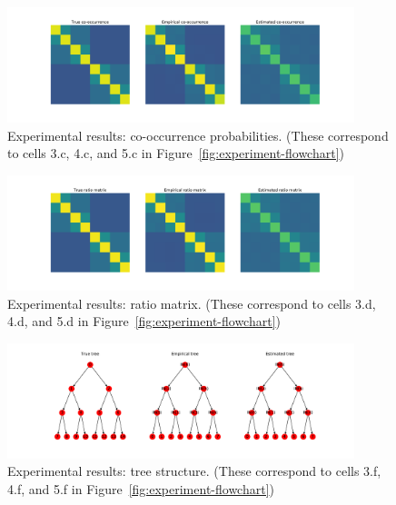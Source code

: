 \documentclass{article}
\theoremstyle{definition}
\begin{document}
\begin{figure}[hpbt]
    \centering
    \includegraphics[width=0.9\textwidth]{figures/True-vs-Empirical-vs-Estimated-cooccur.pdf}
    \caption{Experimental results: co-occurrence probabilities.  (These correspond to cells 3.c, 4.c, and 5.c in Figure~\ref{fig:experiment-flowchart})}
    \label{fig:True-vs-Empirical-vs-Estimated-cooccur}
\end{figure}

\begin{figure}[hpbt]
    \centering
    \includegraphics[width=0.9\textwidth]{figures/True-vs-Empirical-vs-Estimated-ratio_matrix.pdf}
    \caption{Experimental results: ratio matrix.  (These correspond to cells 3.d, 4.d, and 5.d in Figure~\ref{fig:experiment-flowchart})}
    \label{fig:True-vs-Empirical-vs-Estimated-ratio_matrix}
\end{figure}

\begin{figure}[hpbt]
    \centering
    \includegraphics[width=0.9\textwidth]{figures/True-vs-Empirical-vs-Estimated-tree.pdf}
    \caption{Experimental results: tree structure.  (These correspond to cells 3.f, 4.f, and 5.f in Figure~\ref{fig:experiment-flowchart})}
    \label{fig:True-vs-Empirical-vs-Estimated-tree}
\end{figure}
\end{document}

